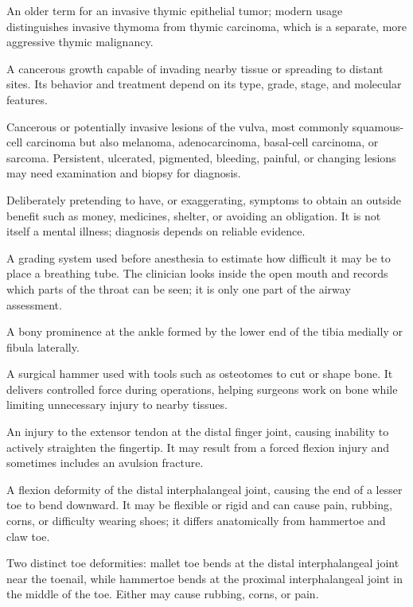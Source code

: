  An older term for an invasive thymic epithelial tumor; modern usage distinguishes invasive thymoma from thymic carcinoma, which is a separate, more aggressive thymic malignancy.

 A cancerous growth capable of invading nearby tissue or spreading to distant sites. Its behavior and treatment depend on its type, grade, stage, and molecular features.

 Cancerous or potentially invasive lesions of the vulva, most commonly squamous-cell carcinoma but also melanoma, adenocarcinoma, basal-cell carcinoma, or sarcoma. Persistent, ulcerated, pigmented, bleeding, painful, or changing lesions may need examination and biopsy for diagnosis.

 Deliberately pretending to have, or exaggerating, symptoms to obtain an outside benefit such as money, medicines, shelter, or avoiding an obligation. It is not itself a mental illness; diagnosis depends on reliable evidence.

 A grading system used before anesthesia to estimate how difficult it may be to place a breathing tube. The clinician looks inside the open mouth and records which parts of the throat can be seen; it is only one part of the airway assessment.

 A bony prominence at the ankle formed by the lower end of the tibia medially or fibula laterally.

 A surgical hammer used with tools such as osteotomes to cut or shape bone. It delivers controlled force during operations, helping surgeons work on bone while limiting unnecessary injury to nearby tissues.

 An injury to the extensor tendon at the distal finger joint, causing inability to actively straighten the fingertip. It may result from a forced flexion injury and sometimes includes an avulsion fracture.

 A flexion deformity of the distal interphalangeal joint, causing the end of a lesser toe to bend downward. It may be flexible or rigid and can cause pain, rubbing, corns, or difficulty wearing shoes; it differs anatomically from hammertoe and claw toe.

 Two distinct toe deformities: mallet toe bends at the distal interphalangeal joint near the toenail, while hammertoe bends at the proximal interphalangeal joint in the middle of the toe. Either may cause rubbing, corns, or pain.

